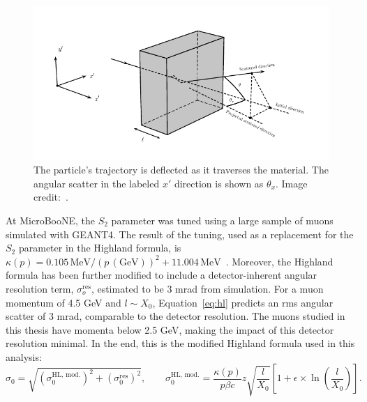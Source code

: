 \begin{figure}[]
\centering
\includegraphics[width=.80\textwidth]{images/Reconstruction/mcs}
\caption[Multiple Coulomb Scattering Sketch]{The particle's trajectory is deflected as it traverses the material. The angular scatter in the labeled $x'$ direction is shown as $\theta_x$. Image credit:~\cite{mcs}.}
\label{fig:mcs}
\end{figure}

At MicroBooNE, the $S_2$ parameter was tuned using a large sample of muons simulated with GEANT4. The result of the tuning, used as a replacement for the $S_2$ parameter in the Highland formula, is $\kappa(p) = 0.105\,\text{MeV} / (p\,(\text{GeV}))^2 + 11.004\,\text{MeV}$~\cite{mcs}. Moreover, the Highland formula has been further modified to include a detector-inherent angular resolution term, $\sigma_o^\text{res}$, estimated to be 3 mrad from simulation. For a muon momentum of 4.5 GeV and $l \sim X_0$, Equation~\eqref{eq:hl} predicts an \acrshort{rms} angular scatter of 3 mrad, comparable to the detector resolution. The muons studied in this thesis have momenta below 2.5 GeV, making the impact of this detector resolution minimal. In the end, this is the modified Highland formula used in this analysis:
\begin{equation}
\label{eq:hl_mod}
\sigma_{0} =  \sqrt{(\sigma_{0}^\text{HL, mod.})^2 + (\sigma_{0}^\text{res})^2}, \qquad \sigma_{0}^\text{HL, mod.} = \frac{\kappa(p)}{p\beta c}z\sqrt{\frac{l}{X_0}} \left[ 1 + \epsilon \times \ln\left(\frac{l}{X_0}\right) \right].
\end{equation}

